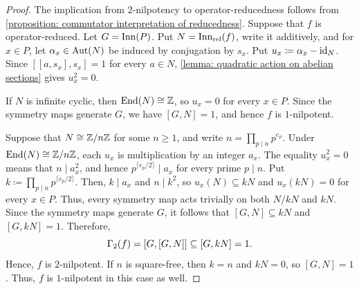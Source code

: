 \begin{proof}
The implication from $2$-nilpotency to operator-reducedness follows from \cref{proposition: commutator interpretation of reducedness}. Suppose that $f$ is operator-reduced.
Let $G=\operatorname{Inn}(P)$.
Put $N=\operatorname{Inn_{rel}}(f)$, write it additively, and for $x\in P$, let $\alpha_x\in\operatorname{Aut}(N)$ be induced by conjugation by $s_x$. Put $u_x\coloneqq\alpha_x-\operatorname{id}_N$. Since $[[a,s_x],s_x]=1$ for every $a\in N$, \cref{lemma: quadratic action on abelian sections} gives $u_x^2=0$.

If $N$ is infinite cyclic, then $\operatorname{End}(N)\cong\mathbb{Z}$, so $u_x=0$ for every $x\in P$. Since the symmetry maps generate $G$, we have $[G,N]=1$, and hence $f$ is $1$-nilpotent.

Suppose that $N\cong\mathbb{Z}/n\mathbb{Z}$ for some $n\geq1$, and write $\textstyle n=\prod_{p\mid n}p^{e_p}$. Under $\operatorname{End}(N)\cong\mathbb{Z}/n\mathbb{Z}$, each $u_x$ is multiplication by an integer $a_x$. The equality $u_x^2=0$ means that $n\mid a_x^2$, and hence $p^{\lceil e_p/2\rceil}\mid a_x$ for every prime $p\mid n$. Put $\textstyle k\coloneqq\prod_{p\mid n}p^{\lceil e_p/2\rceil}$. Then, $k\mid a_x$ and $n\mid k^2$, so $u_x(N)\subseteq kN$ and $u_x(kN)=0$ for every $x\in P$. Thus, every symmetry map acts trivially on both $N/kN$ and $kN$. Since the symmetry maps generate $G$, it follows that $[G,N]\subseteq kN$ and $[G,kN]=1$. Therefore,
\[
    \Gamma_{2}(f) = [G,[G,N]] \subseteq [G,kN] = 1.
\]
Hence, $f$ is $2$-nilpotent. If $n$ is square-free, then $k=n$ and $kN=0$, so $[G,N]=1$. Thus, $f$ is $1$-nilpotent in this case as well.
\end{proof}
